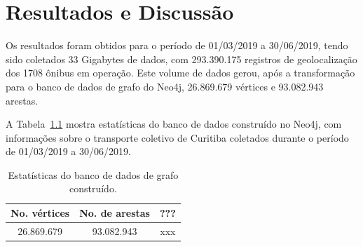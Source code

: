 
\chapter{Resultados e Discussão}\label{cap:resultadosediscussao}



Os resultados foram obtidos para o período de  01/03/2019 a 30/06/2019, tendo sido coletados 33 Gigabytes de dados, com 293.390.175 registros de geolocalização dos 1708 ônibus em operação. Este volume de dados gerou, após a transformação para o banco de dados de grafo do Neo4j, 26.869.679 vértices e 93.082.943 arestas.


A Tabela~\ref{tab:neo} mostra estatísticas do banco de dados construído no Neo4j, com informações sobre o transporte coletivo de Curitiba coletados durante o período de 01/03/2019 a 30/06/2019.

\begin{table}[h]
    \caption{Estatísticas do banco de dados de grafo construído.}
    \label{tab:neo}
    \centering
    \begin{tabular}{ccc} 
        \hline
        No. vértices & No. de arestas & ???\\
        \hline
        26.869.679 & 93.082.943 & xxx \\
        \hline  
    \end{tabular}
\end{table}


